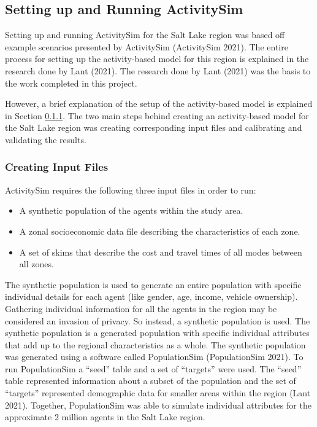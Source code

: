 \documentclass[12pt, oneside, openright]{byuthesis}
\providecommand{\tightlist}{%
  \setlength{\itemsep}{0pt}\setlength{\parskip}{0pt}}
\begin{document}
\hypertarget{setting-up-and-running-activitysim}{%
\subsection{Setting up and Running ActivitySim}\label{setting-up-and-running-activitysim}}

Setting up and running ActivitySim for the Salt Lake region was based off example scenarios presented by ActivitySim (ActivitySim 2021). The entire process for setting up the activity-based model for this region is explained in the research done by Lant (2021). The research done by Lant (2021) was the basis to the work completed in this project.

However, a brief explanation of the setup of the activity-based model is explained in Section \ref{asiminput}. The two main steps behind creating an activity-based model for the Salt Lake region was creating corresponding input files and calibrating and validating the results.

\hypertarget{asiminput}{%
\subsubsection{Creating Input Files}\label{asiminput}}

ActivitySim requires the following three input files in order to run:

\begin{itemize}
\tightlist
\item
  A synthetic population of the agents within the study area.
\item
  A zonal socioeconomic data file describing the characteristics of each zone.
\item
  A set of skims that describe the cost and travel times of all modes between all zones.
\end{itemize}

The synthetic population is used to generate an entire population with specific individual details for each agent (like gender, age, income, vehicle ownership). Gathering individual information for all the agents in the region may be considered an invasion of privacy. So instead, a synthetic population is used. The synthetic population is a generated population with specific individual attributes that add up to the regional characteristics as a whole. The synthetic population was generated using a software called PopulationSim (PopulationSim 2021). To run PopulationSim a ``seed'' table and a set of ``targets'' were used. The ``seed'' table represented information about a subset of the population and the set of ``targets'' represented demographic data for smaller areas within the region (Lant 2021). Together, PopulationSim was able to simulate individual attributes for the approximate 2 million agents in the Salt Lake region.
\end{document}
